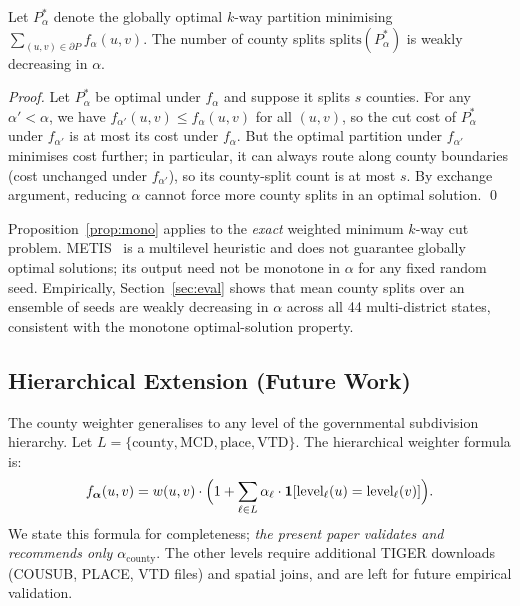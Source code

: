 \begin{proposition}
\label{prop:mono}
Let $P^*_\alpha$ denote the globally optimal $k$-way partition minimising
$\sum_{(u,v)\in\partial P} f_\alpha(u,v)$.
The number of county splits $\text{splits}(P^*_\alpha)$ is weakly decreasing in $\alpha$.
\end{proposition}

\begin{proof}
Let $P^*_\alpha$ be optimal under $f_\alpha$ and suppose it splits $s$ counties.
For any $\alpha' < \alpha$, we have $f_{\alpha'}(u,v) \leq f_\alpha(u,v)$ for all
$(u,v)$, so the cut cost of $P^*_\alpha$ under $f_{\alpha'}$ is at most its cost
under $f_\alpha$.
But the optimal partition under $f_{\alpha'}$ minimises cost further;
in particular, it can always route along county boundaries (cost unchanged
under $f_{\alpha'}$), so its county-split count is at most $s$.
By exchange argument, reducing $\alpha$ cannot force more county splits in an
optimal solution. \qed
\end{proof}

\begin{remark}
Proposition~\ref{prop:mono} applies to the \emph{exact} weighted minimum
$k$-way cut problem.
METIS~\citep{Karypis1998} is a multilevel heuristic and does not guarantee
globally optimal solutions; its output need not be monotone in $\alpha$ for
any fixed random seed.
Empirically, Section~\ref{sec:eval} shows that mean county splits over an
ensemble of seeds are weakly decreasing in $\alpha$ across all 44 multi-district
states, consistent with the monotone optimal-solution property.
\end{remark}

\subsection{Hierarchical Extension (Future Work)}
\label{sec:hierarchy}

The county weighter generalises to any level of the governmental subdivision
hierarchy.
Let $L = \{\text{county}, \text{MCD}, \text{place}, \text{VTD}\}$.
The hierarchical weighter formula is:
\[
  f_{\boldsymbol\alpha}(u,v) = w(u,v) \cdot \Bigl(1 + \sum_{\ell \in L} \alpha_\ell \cdot \mathbf{1}[\text{level}_\ell(u) = \text{level}_\ell(v)]\Bigr).
\]
We state this formula for completeness; \emph{the present paper validates and
recommends only $\alpha_{\text{county}}$}.
The other levels require additional TIGER downloads (COUSUB, PLACE, VTD files)
and spatial joins, and are left for future empirical validation.


